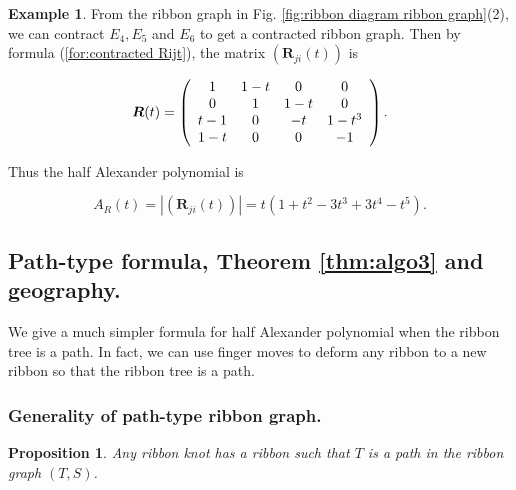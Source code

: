 \documentclass{amsart}
\newtheorem{prop}[thm]{Proposition}
\theoremstyle{definition}
\newtheorem{example}[thm]{Example}
\theoremstyle{remark}
\numberwithin{equation}{subsection}
\begin{document}
\begin{example}
From the ribbon graph in Fig. \ref{fig:ribbon diagram ribbon graph}(2), we can contract $E_{4},E_{5}$ and $E_{6}$ to get a contracted ribbon graph. Then by formula (\ref{for:contracted Rijt}), the matrix $\left(\boldsymbol{R}_{ji}(t)\right)$ is

\begin{equation}
\boldsymbol{R}(t)=\left(\begin{array}[]{cccc}
1 & 1-t & 0 & 0 \\
0 & 1 & 1-t & 0 \\
t-1 & 0 & -t & 1-t^{3} \\
1-t & 0 & 0 & -1
\end{array}\right). \nonumber
\end{equation}

Thus the half Alexander polynomial is

\begin{equation}
A_{R}(t)=|\left(\boldsymbol{R}_{ji}(t)\right)|=t(1+t^{2}-3t^{3}+3t^{4}-t^{5}). \nonumber
\end{equation}
\end{example}

\subsection{Path-type formula, Theorem \ref{thm:algo3} and geography.}
We give a much simpler formula for half Alexander polynomial when the ribbon tree is a path. In fact, we can use finger moves to deform any ribbon to a new ribbon so that the ribbon tree is a path.

\subsubsection{Generality of path-type ribbon graph.}
\begin{prop}\label{prop:path}
Any ribbon knot has a ribbon such that $T$ is a path in the ribbon graph $(T,S)$.
\end{prop}
\end{document}
